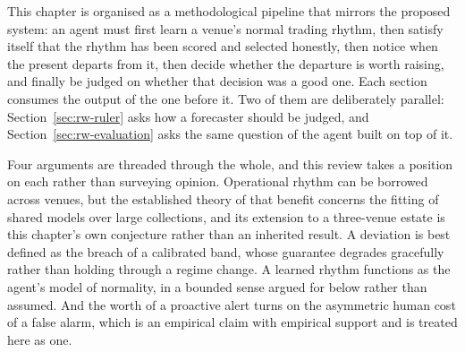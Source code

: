 %
%
%

This chapter is organised as a methodological pipeline that mirrors the
proposed system: an agent must first learn a venue's normal trading rhythm,
then satisfy itself that the rhythm has been scored and selected honestly, then
notice when the present departs from it, then decide whether the departure is
worth raising, and finally be judged on whether that decision was a good one.
Each section consumes the output of the one before it. Two of them are
deliberately parallel: Section~\ref{sec:rw-ruler} asks how a forecaster should
be judged, and Section~\ref{sec:rw-evaluation} asks the same question of the
agent built on top of it.

Four arguments are threaded through the whole, and this review takes a position
on each rather than surveying opinion. Operational rhythm can be borrowed
across venues, but the established theory of that benefit concerns the fitting
of shared models over large collections, and its extension to a three-venue
estate is this chapter's own conjecture rather than an inherited result. A
deviation is best defined as the breach of a calibrated band, whose guarantee
degrades gracefully rather than holding through a regime change. A learned
rhythm functions as the agent's model of normality, in a bounded sense argued
for below rather than assumed. And the worth of a proactive alert turns on the
asymmetric human cost of a false alarm, which is an empirical claim with
empirical support and is treated here as one.

